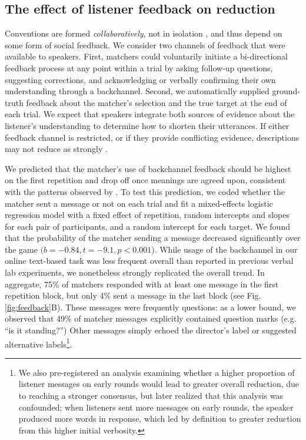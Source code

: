 \documentclass[alpha-refs]{wiley-article}
\begin{document}
\subsection{The effect of listener feedback on reduction}\label{listener-feedback}

Conventions are formed \emph{collaboratively}, not in isolation \citep{ClarkWilkesGibbs86_ReferringCollaborative}, and thus depend on some form of social feedback.
We consider two channels of feedback that were available to speakers.
First, matchers could voluntarily initiate a bi-directional feedback process at any point within a trial by asking follow-up questions, suggesting corrections, and acknowledging or verbally confirming their own understanding through a backchannel.
Second, we automatically supplied ground-truth feedback about the matcher's selection and the true target at the end of each trial.
We expect that speakers integrate both sources of evidence about the listener's understanding to determine how to shorten their utterances.
If either feedback channel is restricted, or if they provide conflicting evidence, descriptions may not reduce as strongly \citep{KraussWeinheimer66_Tangrams, HupetChantraine92_CollaborationOrRepitition, GarrodFayLeeOberlanderMacLeod07_GraphicalSymbolSystems}.

We predicted that the matcher's use of backchannel feedback should be highest on the first repetition and drop off once meanings are agreed upon, consistent with the patterns observed by \citep{ClarkWilkesGibbs86_ReferringCollaborative}.
To test this prediction, we coded whether the matcher sent a message or not on each trial and fit a mixed-effects logistic regression model with a fixed effect of repetition, random intercepts and slopes for each pair of participants, and a random intercept for each target.
We found that the probability of the matcher sending a message decreased significantly over the game $(b=-0.84, t = -9.1, p < 0.001$).
While usage of the backchannel in our online text-based task was less frequent overall than reported in previous verbal lab experiments, we nonetheless strongly replicated the overall trend.
In aggregate, 75\% of matchers responded with at least one message in the first repetition block, but only 4\% sent a message in the last block (see Fig. \ref{fig:feedback}B).
These messages were frequently questions: as a lower bound, we observed that 49\% of matcher messages explicitly contained question marks (e.g. ``is it standing?'')
Other messages simply echoed the director's label or suggested alternative labels\footnote{We also pre-registered an analysis examining whether a higher proportion of listener messages on early rounds would lead to greater overall reduction, due to reaching a stronger consensus, but later realized that this analysis was confounded; when listeners sent more messages on early rounds, the speaker produced more words in response, which led by definition to greater reduction from this higher initial verbosity.}.
\end{document}
